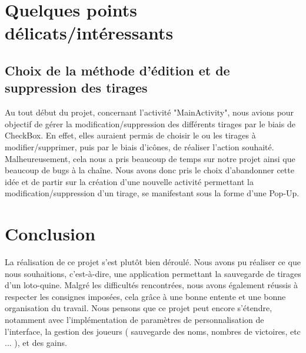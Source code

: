 \documentclass{article}
\begin{document}
\section{Quelques points délicats/intéressants}
\subsection{Choix de la méthode d'édition et de suppression des tirages}
\vspace{1em}
Au tout début du projet, concernant l'activité "MainActivity", nous avions pour objectif de gérer la modification/suppression des différents tirages par le biais de CheckBox. En effet, elles auraient permis de choisir le ou les tirages à modifier/supprimer, puis par le biais d'icônes, de réaliser l'action souhaité.
\newline Malheureusement, cela nous a pris beaucoup de temps sur notre projet ainsi que beaucoup de bugs à la chaîne. Nous avons donc pris le choix d'abandonner cette idée et de partir sur la création d'une nouvelle activité permettant la modification/suppression d'un tirage, se manifestant sous la forme d'une Pop-Up.

\section{Conclusion}
\vspace{1em}
La réalisation de ce projet s'est plutôt bien déroulé. Nous avons pu réaliser ce que nous souhaitions, c'est-à-dire, une application permettant la sauvegarde de tirages d'un loto-quine. Malgré les difficultés rencontrées, nous avons également réussis à respecter les consignes imposées, cela grâce à une bonne entente et une bonne organisation du travail.
\newline Nous pensons que ce projet peut encore s'étendre, notamment avec l'implémentation de paramètres de personnalisation de l'interface, la gestion des joueurs ( sauvegarde des noms, nombres de victoires, etc ... ), et des gains.


\newpage
\end{document}
